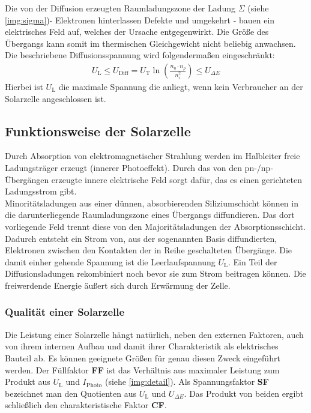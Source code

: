 \documentclass[numbers=noenddot,12pt,a4paper]{scrartcl}
\newcommand{\ix}[1]{_\text{#1}}
\newcommand{\fett}[1]{\textbf{#1}}
\begin{document}
Die von der Diffusion erzeugten Raumladungszone der Ladung $\Sigma$ (siehe \ref{img:sigma})- Elektronen hinterlassen Defekte und umgekehrt - bauen ein elektrisches Feld auf, welches der Ursache entgegenwirkt. Die Größe des Übergangs kann somit im thermischen Gleichgewicht nicht beliebig anwachsen. Die beschriebene Diffusionsspannung wird folgendermaßen eingeschränkt:
\begin{align*}
	U\ix{L}\leq U\ix{Diff}=U\ix{T}\ln\left(\frac{n_\eta\cdot n_\rho}{n\ix{i}^2}\right)\leq U_{\Delta E}
\end{align*}
Hierbei ist $U\ix{L}$ die maximale Spannung die anliegt, wenn kein Verbraucher an der Solarzelle angeschlossen ist.
\subsection{Funktionsweise der Solarzelle}
Durch Absorption von elektromagnetischer Strahlung werden im Halbleiter freie Ladungsträger erzeugt (innerer Photoeffekt). Durch das von den pn-/np-Übergängen erzeugte innere elektrische Feld sorgt dafür, das es einen gerichteten Ladungsstrom gibt.\\
Minoritätsladungen aus einer dünnen, absorbierenden Siliziumschicht können in die darunterliegende Raumladungszone eines Übergangs diffundieren. Das dort vorliegende Feld trennt diese von den Majoritätsladungen der Absorptionsschicht. Dadurch entsteht ein Strom von, aus der sogenannten Basis diffundierten, Elektronen zwischen den Kontakten der in Reihe geschalteten Übergänge. Die damit einher gehende Spannung ist die Leerlaufspannung $U\ix{L}$. Ein Teil der Diffusionsladungen rekombiniert noch bevor sie zum Strom beitragen können. Die freiwerdende Energie äußert sich durch Erwärmung der Zelle. 
\subsubsection{Qualität einer Solarzelle}
Die Leistung einer Solarzelle hängt natürlich, neben den externen Faktoren, auch von ihrem internen Aufbau und damit ihrer Charakteristik als elektrisches Bauteil ab. Es können geeignete Größen für genau diesen Zweck eingeführt werden. Der Füllfaktor \fett{FF} ist das Verhältnis aus maximaler Leistung zum Produkt aus $U\ix{L}$ und $I\ix{Photo}$ (siehe \ref{img:detail}). Als Spannungsfaktor \fett{SF} bezeichnet man den Quotienten aus $U\ix{L}$ und $U_{\Delta E}$. Das Produkt von beiden ergibt schließlich den charakteristische Faktor \fett{CF}.
\end{document}

